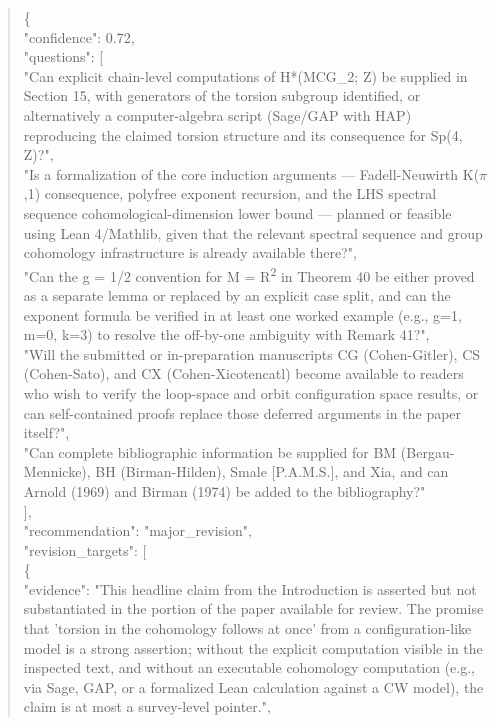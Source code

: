 \documentclass[11pt]{article}
\begin{document}
\begin{quote}\small\ttfamily\raggedright
\{\\
  "confidence": 0.72,\\
  "questions": [\\
    "Can explicit chain-level computations of H*(MCG\_2; Z) be supplied in Section 15, with generators of the torsion subgroup identified, or alternatively a computer-algebra script (Sage/GAP with HAP) reproducing the claimed torsion structure and its consequence for Sp(4, Z)?",\\
    "Is a formalization of the core induction arguments --- Fadell-Neuwirth K(\ensuremath{\pi},1) consequence, polyfree exponent recursion, and the LHS spectral sequence cohomological-dimension lower bound --- planned or feasible using Lean 4/Mathlib, given that the relevant spectral sequence and group cohomology infrastructure is already available there?",\\
    "Can the g = 1/2 convention for M = R\textsuperscript{2} in Theorem 40 be either proved as a separate lemma or replaced by an explicit case split, and can the exponent formula be verified in at least one worked example (e.g., g=1, m=0, k=3) to resolve the off-by-one ambiguity with Remark 41?",\\
    "Will the submitted or in-preparation manuscripts CG (Cohen-Gitler), CS (Cohen-Sato), and CX (Cohen-Xicotencatl) become available to readers who wish to verify the loop-space and orbit configuration space results, or can self-contained proofs replace those deferred arguments in the paper itself?",\\
    "Can complete bibliographic information be supplied for BM (Bergau-Mennicke), BH (Birman-Hilden), Smale [P.A.M.S.], and Xia, and can Arnold (1969) and Birman (1974) be added to the bibliography?"\\
  ],\\
  "recommendation": "major\_revision",\\
  "revision\_targets": [\\
    \{\\
      "evidence": "This headline claim from the Introduction is asserted but not substantiated in the portion of the paper available for review. The promise that 'torsion in the cohomology follows at once' from a configuration-like model is a strong assertion; without the explicit computation visible in the inspected text, and without an executable cohomology computation (e.g., via Sage, GAP, or a formalized Lean calculation against a CW model), the claim is at most a survey-level pointer.",\\

\end{quote}
\end{document}
